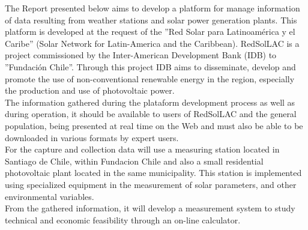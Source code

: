 The Report presented below aims to develop a platform for manage information of data resulting from weather stations and solar power generation plants. This platform is developed at the request of the ''Red Solar para Latinoamérica y el Caribe'' (Solar Network for Latin-America and the Caribbean). RedSolLAC is a project commissioned by the Inter-American Development Bank (IDB) to ''Fundación Chile''. Through this project IDB aims to disseminate, develop and promote the use of non-conventional renewable energy in the region, especially the production and use of photovoltaic power. \\

The information gathered during the plataform development process as well as during operation, it should be available to users of RedSolLAC and the general population, being presented at real time on the Web and must also be able to be downloaded in various formats by expert users. \\

For the capture and collection data will use a measuring station located in Santiago de Chile, within Fundacion Chile and also a small residential photovoltaic plant located in the same municipality. This station is implemented using specialized equipment in the measurement of solar parameters, and other environmental variables. \\

From the gathered information, it will develop a measurement system to study technical and economic feasibility through an on-line calculator. \\

